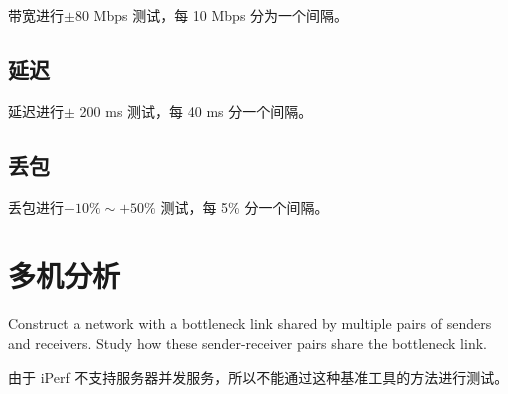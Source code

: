     带宽进行$\pm $80 Mbps 测试，每 10 Mbps 分为一个间隔。


    \subsection{延迟}

    延迟进行$\pm$ 200 ms 测试，每 40 ms 分一个间隔。


    \subsection{丢包}

    丢包进行$-10\%\sim +50\%$ 测试，每 5\% 分一个间隔。


    \section{多机分析}

    Construct a network with a bottleneck link shared by multiple pairs of senders and receivers. Study how these sender-receiver pairs share the bottleneck link.

    由于 iPerf 不支持服务器并发服务，所以不能通过这种基准工具的方法进行测试。


